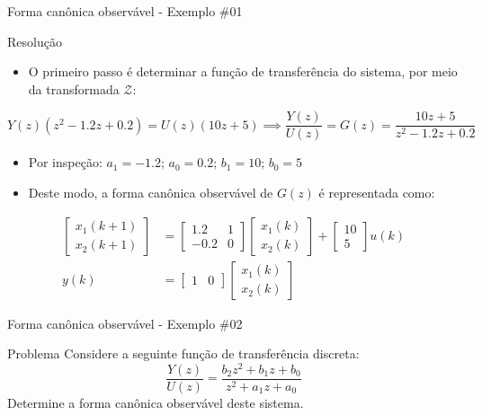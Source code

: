\begin{frame}{Forma canônica observável - Exemplo \#01}
\begin{block}{Resolução}
\begin{itemize}
    \item O primeiro passo é determinar a função de transferência do sistema, por meio da transformada $\mathcal{Z}$:
\end{itemize}
$$Y(z)(z^2 - \num{1,2}z + \num{0,2}) = U(z)(10z + 5) \implies \dfrac{Y(z)}{U(z)} = G(z) = \dfrac{10z + 5}{z^2 - \num{1,2}z + \num{0,2}}$$
\begin{itemize}
    \item Por inspeção: $a_1 = - \num{1,2}$; $a_0 = \num{0,2}$; $b_1 = 10$; $b_0 = 5$
    \item Deste modo, a forma canônica observável de $G(z)$ é representada como:
\end{itemize}
\begin{align*}
    \begin{bmatrix} x_1(k+1) \\ x_2(k+1) \end{bmatrix}
    &=
    \begin{bmatrix}
    \num{1,2} & 1 \\ -\num{0,2} & 0
    \end{bmatrix}
    \begin{bmatrix}
    x_1(k) \\ x_2(k)
    \end{bmatrix}
    +
    \begin{bmatrix}
    10 \\ 5
    \end{bmatrix}
    u(k) \\
    y(k)
    &=
    \begin{bmatrix}
    1 & 0
    \end{bmatrix}
    \begin{bmatrix}
    x_1(k) \\ x_2(k)
    \end{bmatrix}
\end{align*}
\end{block}
\end{frame}

\begin{frame}{Forma canônica observável - Exemplo \#02}
\begin{block}{Problema}
	Considere a seguinte função de transferência discreta:
	$$\dfrac{Y(z)}{U(z)}= \dfrac{b_2z^2 + b_1z + b_0}{z^2 + a_1z + a_0}$$
	Determine a forma canônica observável deste sistema.
\end{block}
\end{frame}

